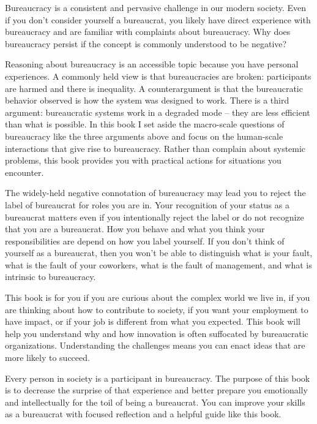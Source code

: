 
Bureaucracy is a consistent and pervasive challenge in our modern society. 
Even if you don't consider yourself a bureaucrat, you likely have direct experience with bureaucracy and are familiar with complaints about bureaucracy. 
Why does bureaucracy persist if the concept is commonly understood to be negative?


Reasoning about bureaucracy is an accessible topic because you have personal experiences.
A commonly held view is that bureaucracies are broken: participants are harmed and there is inequality. 
A counterargument is that the bureaucratic behavior observed is how the system was designed to work. There is a third argument: bureaucratic systems work in a degraded mode -- they are less efficient than what is possible. 
In this book I set aside the macro-scale questions of bureaucracy like the three arguments above and focus on the human-scale interactions that give rise to bureaucracy. Rather than complain about systemic problems, this book provides you with practical actions for situations you encounter.

The widely-held negative connotation of bureaucracy may lead you to reject the label of bureaucrat for roles you are in. Your recognition of your status as a bureaucrat matters even if you intentionally reject the label or do not recognize that you are a bureaucrat. How you behave and what you think your responsibilities are depend on how you label yourself.
If you don't think of yourself as a bureaucrat, then you won't be able to distinguish what is your fault, what is the fault of your coworkers, what is the fault of management, and what is intrinsic to bureaucracy. 


This book is for you if you are curious about the complex world we live in,  if you are thinking about how to contribute to society,  if you want your employment to have impact, or if your job is different from what you expected. This book will help you understand why and how innovation is often suffocated by bureaucratic organizations. Understanding the challenges means you can enact ideas that are more likely to succeed.

Every person in society is a participant in bureaucracy. The purpose of this book is to decrease the surprise of that experience and better prepare you emotionally and intellectually for the toil of being a bureaucrat. You can improve your skills as a bureaucrat with focused reflection and a helpful guide like this book. 

